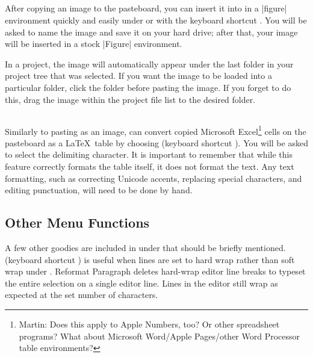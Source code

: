 \subsection[Paste as Image]{}
\label{reference.edit.pasteimg}
After copying an image to the pasteboard, you can insert it into \texnicle in a |figure| environment quickly and easily under  or with the keyboard shortcut . You will be asked to name the image and save it on your hard drive; after that, your image will be inserted in a stock |Figure| environment.

In a project, the image will automatically appear under the last folder in your project tree that was selected. If you want the image to be loaded into a particular folder, click the folder before pasting the image. If you forget to do this, drag the image within the project file list to the desired folder.

\subsection[Paste as Table]{}
\label{reference.edit.pastetab}
Similarly to pasting as an image, \texnicle can convert copied Microsoft Excel\footnote{Martin: Does this apply to Apple Numbers, too? Or other spreadsheet programs? What about Microsoft Word/Apple Pages/other Word Processor table environments?} cells on the pasteboard as a \LaTeX\ table by choosing  (keyboard shortcut ). You will be asked to select the delimiting character. It is important to remember that while this feature correctly formats the table itself, it does not format the text. Any text formatting, such as correcting Unicode accents, replacing special characters, and editing punctuation, will need to be done by hand.


\subsection[Other Edit Menu Functions]{Other  Menu Functions}
\label{reference.edit.other}
A few other goodies are included in under  that should be briefly mentioned.  (keyboard shortcut ) is useful when lines are set to hard wrap rather than soft wrap under . Reformat Paragraph deletes hard-wrap editor line breaks to typeset the entire selection on a single editor line. Lines in the editor still wrap as expected at the set number of characters.

